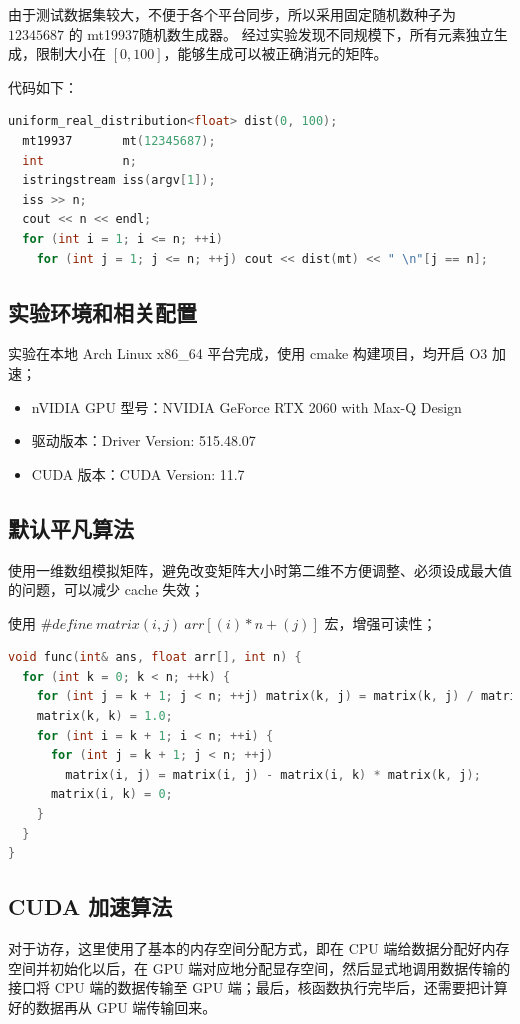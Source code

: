 \documentclass[a4paper]{article}
\begin{document}
由于测试数据集较大，不便于各个平台同步，所以采用固定随机数种子为 $12345687$ 的 mt19937随机数生成器。
经过实验发现不同规模下，所有元素独立生成，限制大小在 $[0, 100]$，能够生成可以被正确消元的矩阵。

代码如下：

\begin{lstlisting}[frame=trbl,language={C++}]
  uniform_real_distribution<float> dist(0, 100);
  mt19937       mt(12345687);
  int           n;
  istringstream iss(argv[1]);
  iss >> n;
  cout << n << endl;
  for (int i = 1; i <= n; ++i)
    for (int j = 1; j <= n; ++j) cout << dist(mt) << " \n"[j == n];
\end{lstlisting}

\subsection{实验环境和相关配置}

实验在本地 Arch Linux x86\_64 平台完成，使用 cmake 构建项目，均开启 O3 加速；

\begin{itemize}
  \item nVIDIA GPU 型号：NVIDIA GeForce RTX 2060 with Max-Q Design
  \item 驱动版本：Driver Version: 515.48.07
  \item CUDA 版本：CUDA Version: 11.7
\end{itemize}

\subsection{默认平凡算法}

使用一维数组模拟矩阵，避免改变矩阵大小时第二维不方便调整、必须设成最大值的问题，可以减少 cache 失效；

使用 $\#define\ matrix(i, j)\ arr[(i) * n + (j)]$ 宏，增强可读性；

\begin{lstlisting}[frame=trbl,language={C++}]
void func(int& ans, float arr[], int n) {
  for (int k = 0; k < n; ++k) {
    for (int j = k + 1; j < n; ++j) matrix(k, j) = matrix(k, j) / matrix(k, k);
    matrix(k, k) = 1.0;
    for (int i = k + 1; i < n; ++i) {
      for (int j = k + 1; j < n; ++j)
        matrix(i, j) = matrix(i, j) - matrix(i, k) * matrix(k, j);
      matrix(i, k) = 0;
    }
  }
}
\end{lstlisting}

\subsection{CUDA 加速算法}
对于访存，这里使用了基本的内存空间分配方式，即在 CPU 端给数据分配好内存空间并初始化以后，在 GPU 端对应地分配显存空间，然后显式地调用数据传输的接口将 CPU 端的数据传输至 GPU 端；最后，核函数执行完毕后，还需要把计算好的数据再从 GPU 端传输回来。
\end{document}
